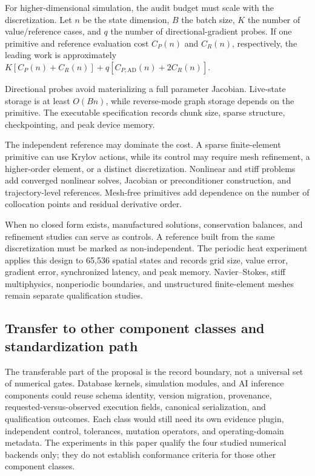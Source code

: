 \documentclass[preprint,12pt,authoryear]{elsarticle}
\begin{document}
For higher-dimensional simulation, the audit budget must scale with the discretization. Let $n$ be the state dimension, $B$ the batch size, $K$ the number of value/reference cases, and $q$ the number of directional-gradient probes. If one primitive and reference evaluation cost $C_P(n)$ and $C_R(n)$, respectively, the leading work is approximately $K[C_P(n)+C_R(n)]+q[C_{P,\mathrm{AD}}(n)+2C_R(n)]$.

Directional probes avoid materializing a full parameter Jacobian. Live-state storage is at least $O(Bn)$, while reverse-mode graph storage depends on the primitive. The executable specification records chunk size, sparse structure, checkpointing, and peak device memory.

The independent reference may dominate the cost. A sparse finite-element primitive can use Krylov actions, while its control may require mesh refinement, a higher-order element, or a distinct discretization. Nonlinear and stiff problems add converged nonlinear solves, Jacobian or preconditioner construction, and trajectory-level references. Mesh-free primitives add dependence on the number of collocation points and residual derivative order.

When no closed form exists, manufactured solutions, conservation balances, and refinement studies can serve as controls. A reference built from the same discretization must be marked as non-independent. The periodic heat experiment applies this design to 65,536 spatial states and records grid size, value error, gradient error, synchronized latency, and peak memory. Navier--Stokes, stiff multiphysics, nonperiodic boundaries, and unstructured finite-element meshes remain separate qualification studies.

\subsection{Transfer to other component classes and standardization path}
The transferable part of the proposal is the record boundary, not a universal set of numerical gates. Database kernels, simulation modules, and AI inference components could reuse schema identity, version migration, provenance, requested-versus-observed execution fields, canonical serialization, and qualification outcomes. Each class would still need its own evidence plugin, independent control, tolerances, mutation operators, and operating-domain metadata. The experiments in this paper qualify the four studied numerical backends only; they do not establish conformance criteria for those other component classes.
\end{document}
